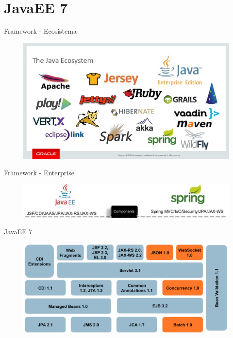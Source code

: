 \documentclass{beamer}
\begin{document}
\section{JavaEE 7}
\begin{frame}{Framework - Ecosistema}
	\begin{figure}
		\centering
		\includegraphics[width=0.9\linewidth]{Images/ecosystem}
	\end{figure}
\end{frame}

\begin{frame}{Framework - Enterprise}
	\begin{figure}
		\centering
		\includegraphics[width=\linewidth]{Images/javaeesp}
	\end{figure}
\end{frame}

\begin{frame}{JavaEE 7}
	\begin{figure}
		\centering
		\includegraphics[width=0.9\linewidth]{Images/javaee7-pancake.png}
	\end{figure}	
\end{frame}
\end{document}
